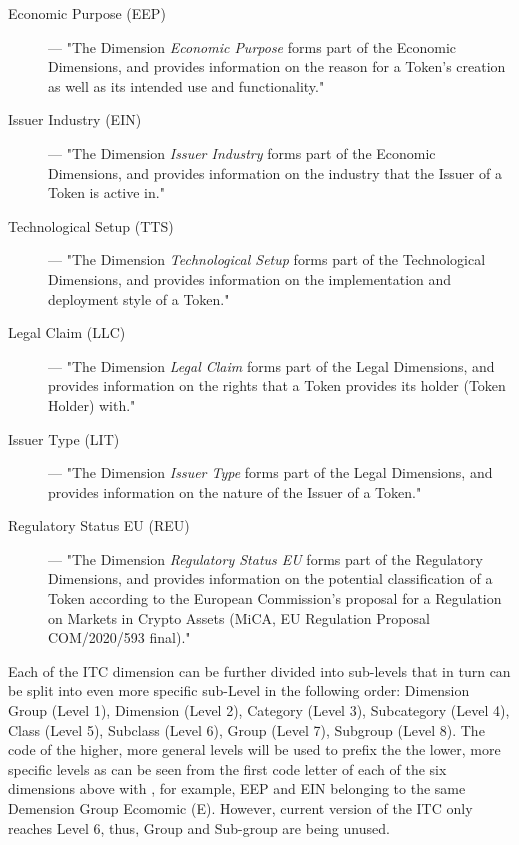 \begin{description}
    \item[Economic Purpose (EEP)] --- "The Dimension \textit{Economic Purpose} forms part of the Economic Dimensions, and provides information on the reason for a Token's creation as well as its intended use and functionality." 
    
    \item[Issuer Industry (EIN)] --- "The Dimension \textit{Issuer Industry} forms part of the Economic Dimensions, and provides information on the industry that the Issuer of a Token is active in."
    
    \item[Technological Setup (TTS)] --- "The Dimension \textit{Technological Setup} forms part of the Technological Dimensions, and provides information on the implementation and deployment style of a Token."
    
    \item[Legal Claim (LLC)] --- "The Dimension \textit{Legal Claim} forms part of the Legal Dimensions, and provides information on the rights that a Token provides its holder (Token Holder) with."
    
    \item[Issuer Type (LIT)] --- "The Dimension \textit{Issuer Type} forms part of the Legal Dimensions, and provides information on the nature of the Issuer of a Token."
    
    \item[Regulatory Status EU (REU)] --- "The Dimension \textit{Regulatory Status EU} forms part of the Regulatory Dimensions, and provides information on the potential classification of a Token according to the European Commission's proposal for a Regulation on Markets in Crypto Assets (MiCA, EU Regulation Proposal COM/2020/593 final)."

\end{description}

Each of the ITC dimension can be further divided into sub-levels that in turn can be split into even more specific sub-Level in the following order: Dimension Group (Level 1), Dimension (Level 2), Category (Level 3), Subcategory (Level 4), Class (Level 5), Subclass (Level 6), Group (Level 7), Subgroup (Level 8). The code of the higher, more general levels will be used to prefix the  the lower, more specific levels as can be seen from the first code letter of each of the six dimensions above with , for example, EEP and EIN belonging to the same Demension Group Ecomomic (E). However, current version of the ITC only reaches Level 6, thus, Group and Sub-group are being unused.

